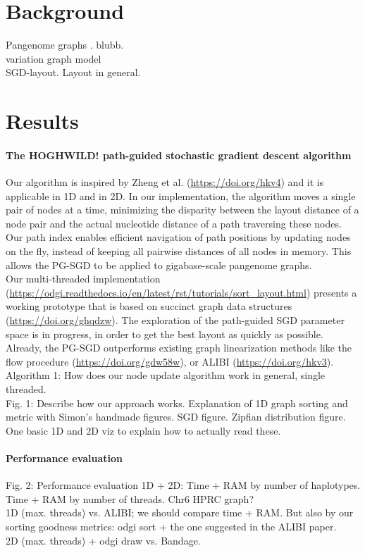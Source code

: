 \documentclass[11pt,hidelinks]{article}
\begin{document}
\section{Background}

Pangenome graphs \cite{computational2016computational}. blubb.
\\
variation graph model
\\
SGD-layout. Layout in general. 
\\
\section{Results}

\paragraph{The HOGHWILD! path-guided stochastic gradient descent algorithm}
Our algorithm is inspired by Zheng et al. (\url{https://doi.org/hkv4}) and it is applicable in 1D and in 2D. In our implementation, the algorithm moves a single pair of nodes at a time, minimizing the disparity between the layout distance of a node pair and the actual nucleotide distance of a path traversing these nodes. Our path index enables efficient navigation of path positions by updating nodes on the fly, instead of keeping all pairwise distances of all nodes in memory. This allows the PG-SGD to be applied to gigabase-scale pangenome graphs. \\
Our multi-threaded implementation (\url{https://odgi.readthedocs.io/en/latest/rst/tutorials/sort_layout.html}) presents a working prototype that is based on succinct graph data structures (\url{https://doi.org/ghqdzw}). The exploration of the path-guided SGD parameter space is in progress, in order to get the best layout as quickly as possible. Already, the PG-SGD outperforms existing graph linearization methods like the flow procedure (\url{https://doi.org/gdw58w}), or ALIBI (\url{https://doi.org/hkv3}).
\\
Algorithm 1: How does our node update algorithm work in general, single threaded.
\\
Fig. 1: Describe how our approach works. Explanation of 1D graph sorting and metric with Simon's handmade figures. SGD figure. Zipfian distribution figure. One basic 1D and 2D viz to explain how to actually read these.
\paragraph{Performance evaluation}
Fig. 2: Performance evaluation 1D + 2D: Time + RAM by number of haplotypes. Time + RAM by number of threads. Chr6 HPRC graph?
\\
1D (max. threads) vs. ALIBI; we should compare time + RAM. But also by our sorting goodness metrics: odgi sort + the one suggested in the ALIBI paper. 
\\
2D (max. threads) + odgi draw vs. Bandage.
\end{document}
